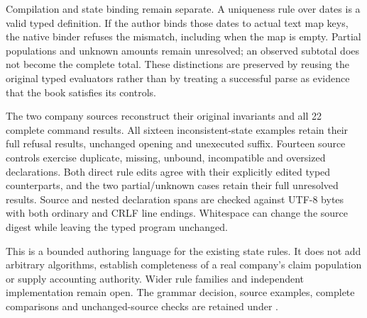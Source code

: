 Compilation and state binding remain separate. A uniqueness rule over dates is
a valid typed definition. If the author binds those dates to actual text map
keys, the native binder refuses the mismatch, including when the map is empty.
Partial populations and unknown amounts remain unresolved; an observed subtotal
does not become the complete total. These distinctions are preserved by reusing
the original typed evaluators rather than by treating a successful parse as
evidence that the book satisfies its controls.

The two company sources reconstruct their original invariants and all 22
complete command results. All sixteen inconsistent-state examples retain their
full refusal results, unchanged opening and unexecuted suffix. Fourteen source
controls exercise duplicate, missing, unbound, incompatible and oversized
declarations. Both direct rule edits agree with their explicitly edited typed
counterparts, and the two partial/unknown cases retain their full unresolved
results. Source and nested declaration spans are checked against UTF-8 bytes
with both ordinary and CRLF line endings. Whitespace can change the source
digest while leaving the typed program unchanged.

This is a bounded authoring language for the existing state rules. It does not
add arbitrary algorithms, establish completeness of a real company's claim
population or supply accounting authority. Wider rule families and independent
implementation remain open. The grammar decision, source examples, complete
comparisons and unchanged-source checks are retained under
.
